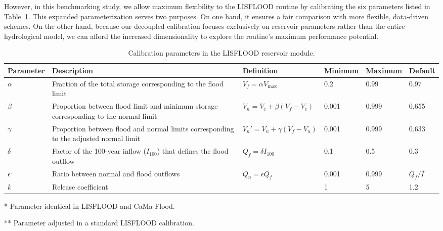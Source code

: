 \documentclass[hess, manuscript]{copernicus}
\begin{document}
However, in this benchmarking study, we allow maximum flexibility to the LISFLOOD routine by calibrating the six parameters listed in Table~\ref{tab:parameters_lisflood}. This expanded parameterization serves two purposes. On one hand, it ensures a fair comparison with more flexible, data-driven schemes. On the other hand, because our decoupled calibration focuses exclusively on reservoir parameters rather than the entire hydrological model, we can afford the increased dimensionality to explore the routine's maximum performance potential.

\begin{table}[t]
    \centering
    \begin{threeparttable}
        \caption{Calibration parameters in the LISFLOOD reservoir module.}
        \label{tab:parameters_lisflood}
        \begin{tabularx}{\textwidth}{lXllll}
            \toprule
            \textbf{Parameter} & \textbf{Description} & \textbf{Definition} & \textbf{Minimum} & \textbf{Maximum} & \textbf{Default} \\
            \midrule
            $\alpha$\tnote{*} & Fraction of the total storage corresponding to the flood limit & $V_f = \alpha V_{\max}$ & 0.2 & 0.99 & 0.97 \\
            $\beta$ & Proportion between flood limit and minimum storage corresponding to the normal limit & $V_n = V_c + \beta (V_f - V_c)$ & 0.001 & 0.999 & 0.655 \\
            $\gamma$\tnote{**} & Proportion between flood and normal limits corresponding to the adjusted normal limit & $V_n' = V_n + \gamma (V_f - V_n)$ & 0.001 & 0.999 & 0.633 \\
            $\delta$\tnote{*} & Factor of the 100-year inflow ($I_{100}$) that defines the flood outflow & $Q_f = \delta I_{100}$ & 0.1 & 0.5 & 0.3 \\
            $\epsilon$\tnote{*}$^,$\tnote{**} & Ratio between normal and flood outflows & $Q_n = \epsilon Q_f$ & 0.001 & 0.999 & $Q_f / \bar{I}$ \\
            $k$ & Release coefficient & & 1 & 5 & 1.2 \\
             \bottomrule
        \end{tabularx}
        \begin{tablenotes}
            \small
            \item{*} Parameter identical in LISFLOOD and CaMa-Flood.
            \item{**} Parameter adjusted in a standard LISFLOOD calibration.
        \end{tablenotes}
    \end{threeparttable}
\end{table}
\end{document}
